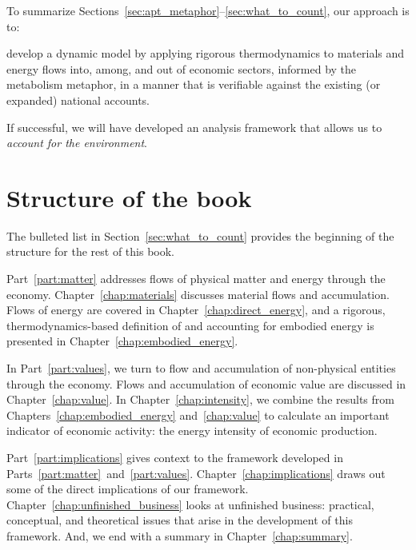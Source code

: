 To summarize Sections~\ref{sec:apt_metaphor}--\ref{sec:what_to_count}, 
our approach is to:

\begin{svgraybox}
	develop a dynamic model 
	by applying rigorous thermodynamics 
	to materials and energy flows into, among, 
	and out of economic sectors,
	informed by the metabolism metaphor,
	in a manner that is verifiable against 
	the existing (or expanded) 
	national accounts.
\end{svgraybox}

\noindent{}If successful, we will have developed an analysis framework 
that allows us to \emph{account for the environment}.


\section{Structure of the book}
\label{sec:structure}

The bulleted list in Section~\ref{sec:what_to_count} 
provides the beginning of the structure for the rest of this book.

Part~\ref{part:matter} addresses flows of physical matter and energy
through the economy.
Chapter~\ref{chap:materials} discusses material flows and accumulation.
Flows of energy are covered in Chapter~\ref{chap:direct_energy}, 
and a rigorous, thermodynamics-based definition of and accounting for 
embodied energy is presented in Chapter~\ref{chap:embodied_energy}.

In Part~\ref{part:values}, we turn to flow and accumulation of 
non-physical entities through the economy. 
Flows and accumulation of economic value are discussed in Chapter~\ref{chap:value}.
In Chapter~\ref{chap:intensity}, we combine the results from 
Chapters~\ref{chap:embodied_energy} and~\ref{chap:value} to
calculate an important indicator of economic activity:
the energy intensity of economic production.

Part~\ref{part:implications} gives context to the framework developed in
Parts~\ref{part:matter}~and~\ref{part:values}.
Chapter~\ref{chap:implications} draws out some of the direct implications
of our framework.
Chapter~\ref{chap:unfinished_business} looks at 
unfinished business: practical, conceptual, and theoretical issues
that arise in the development of this framework.
And, we end with a summary in Chapter~\ref{chap:summary}.

